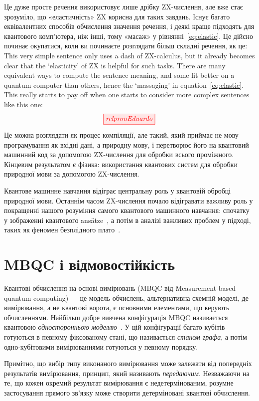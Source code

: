 \documentclass[11pt]{article}
\theoremstyle{definition}
\begin{document}
{Це дуже просте речення використовує лише дрібку ZX-числення, але вже стає зрозуміло, що «еластичність» ZX корисна для таких завдань. Існує багато еквівалентних способів обчислення значення речення, і деякі краще підходять для квантового комп’ютера, ніж інші, тому «масаж» у рівнянні~\eqref{eq:elastic}. Це дійсно починає окупатися, коли ви починаєте розглядати більш складні речення, як це:
This very simple sentence only uses a dash of ZX-calculus, but it already becomes clear that the `elasticity' of ZX is helpful for such tasks. There are many equivalent ways to compute the sentence meaning, and some fit better on a quantum computer than others, hence the `massaging' in equation~\eqref{eq:elastic}. This really starts to pay off when one starts to consider more complex sentences like this one:
\[
\tikzfig{relpronEduardo} 
\]
Це можна розглядати як процес компіляції, але такий, який приймає не мову програмування як вхідні дані, а природну мову, і перетворює його на квантовий машинний код за допомогою ZX-числення для обробки всього проміжного. Кінцевим результатом є фізика: використання квантових систем для обробки природної мови за допомогою ZX-числення.

Квантове машинне навчання відіграє центральну роль у квантовій обробці природної мови. Останнім часом ZX-числення почало відігравати важливу роль у покращенні нашого розуміння самого квантового машинного навчання: спочатку у зображенні квантового ans\"atze~\cite{yeung2020diagrammatic}, а потім в аналізі важливих проблем у підході, таких як феномен безплідного плато~\cite{zhao2021analyzing}.

\section{MBQC і відмовостійкість}\label{sec:prac}%
     
Квантові обчислення на основі вимірювань (MBQC від Measurement-based quantum computing) — це модель обчислень, альтернативна схемній моделі, де вимірювання, а не квантові ворота, є основними елементами, що керують обчисленнями. Найбільш добре вивчена конфігурація MBQC називається квантовою \textit{односторонньою моделлю}~\cite{MBQC2}. У цій конфігурації багато кубітів готуються в певному фіксованому стані, що називається \textit{станом графа}, а потім одно-кубітовими вимірюваннями готуються у певному порядку.

Примітно, що вибір типу виконаного вимірювання може залежати від попередніх результатів вимірювання, принцип, який називають \textit{передаючим}. Незважаючи на те, що кожен окремий результат вимірювання є недетермінованим, розумне застосування прямого зв’язку може створити детерміновані квантові обчислення.

}
\end{document}

